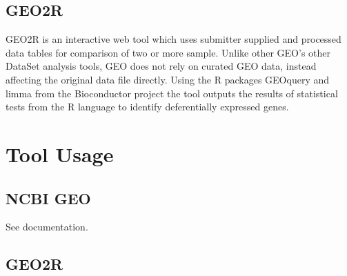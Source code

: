     \subsection{GEO2R}

    GEO2R is an interactive web tool which uses submitter supplied and processed data tables for comparison of two or more sample.\autocite{B21} Unlike other GEO’s other DataSet analysis tools, GEO does not rely on curated GEO data, instead affecting the original data file directly.\autocite{B21} Using the R packages GEOquery and limma from the Bioconductor project the tool outputs the results of statistical tests from the R language to identify deferentially expressed genes.\autocite{B21} 

\section{Tool Usage}

    \subsection{NCBI GEO}

    See documentation.\autocite{B20}

    \subsection{GEO2R}

